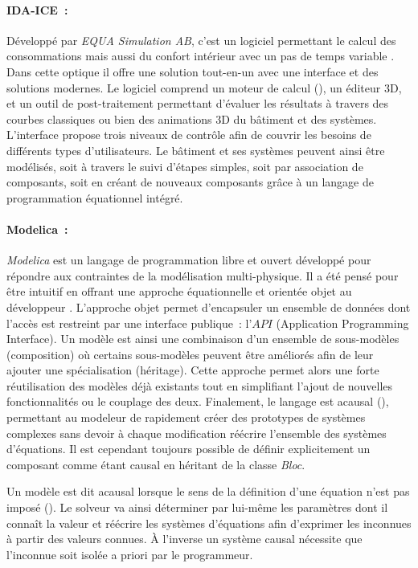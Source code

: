 \paragraph{IDA-ICE~:} %
\label{par:ida_ice}
Développé par \textit{EQUA Simulation AB}, c’est un logiciel permettant le calcul des
consommations mais aussi du confort intérieur avec un pas de temps variable
\parencite{Kalamees2004}. Dans cette optique il offre une solution tout-en-un avec une
interface et des solutions modernes. Le logiciel comprend un moteur de calcul (),
un éditeur $3$D, et un outil de post-traitement permettant d’évaluer les résultats à
travers des courbes classiques ou bien des animations $3$D du bâtiment et des systèmes.
L’interface propose trois niveaux de contrôle afin de couvrir les besoins de différents
types d’utilisateurs. Le bâtiment et ses systèmes peuvent ainsi être modélisés, soit à
travers le suivi d’étapes simples, soit par association de composants, soit en créant de nouveaux
composants grâce à un langage de programmation équationnel intégré.

\paragraph{Modelica~:} %
\label{par:modelica_}
\textit{Modelica} est un langage de programmation libre et ouvert
développé pour répondre aux contraintes de la modélisation multi-physique. Il a été pensé
pour être intuitif en offrant une approche équationnelle et orientée objet au développeur
\parencite{Wetter2016290}.
L’approche objet permet d’encapsuler un ensemble de données dont l’accès est restreint par
une interface publique~: l’$API$ (Application Programming Interface). Un modèle est
ainsi une combinaison d’un ensemble de sous-modèles (composition) où certains sous-modèles
peuvent être améliorés afin de leur ajouter une spécialisation (héritage). Cette
approche permet alors une forte réutilisation des modèles déjà existants tout en
simplifiant l’ajout de nouvelles fonctionnalités ou le couplage des deux. Finalement, le
langage est acausal (), permettant au modeleur de rapidement
créer des prototypes de systèmes complexes sans devoir à chaque modification réécrire
l’ensemble des systèmes d’équations. Il est cependant toujours possible de définir
explicitement un composant comme étant causal en héritant de la classe \textit{Bloc}.

\begin{Def}[Acausal]\label{def:acausal}
Un modèle est dit acausal lorsque le sens de la définition d’une équation n’est pas
imposé (). Le solveur va ainsi déterminer par lui-même les
paramètres dont il connaît la valeur et réécrire les systèmes d’équations afin d’exprimer
les inconnues à partir des valeurs connues. À l’inverse un système causal nécessite
que l’inconnue soit isolée a priori par le programmeur.
\end{Def}

